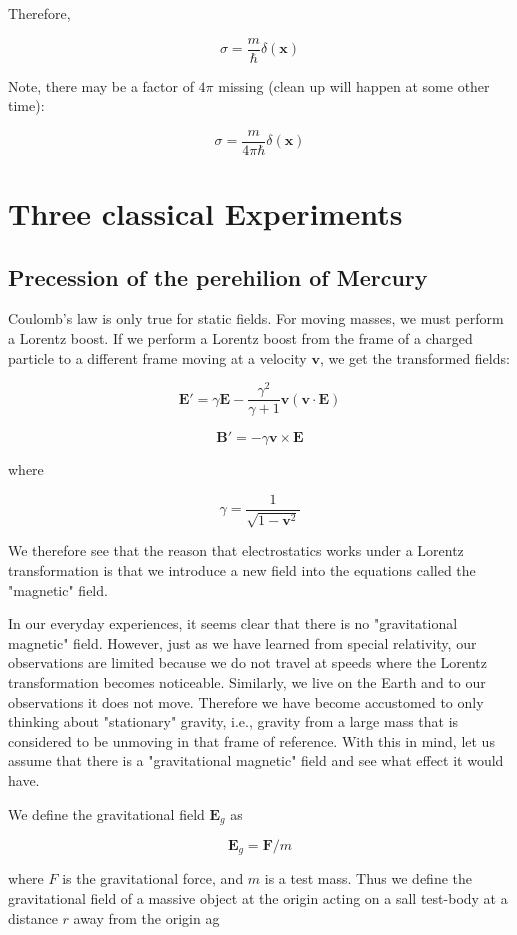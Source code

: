 \documentclass {article}
\renewcommand\vec{\mathbf}
\begin{document}
Therefore,

$$\sigma = \frac m \hbar \delta (\vec x) $$

Note, there may be a factor of $4 \pi $ missing (clean up will happen at some other time):

$$\sigma = \frac m {4 \pi \hbar} \delta (\vec x) $$


\newpage

\section{Three classical Experiments}
\subsection{Precession of the perehilion of Mercury}


Coulomb's law is only true for static fields. For moving masses, we must perform a Lorentz boost. If we perform a  Lorentz boost from the frame of a charged particle to a different frame moving at a velocity $\vec v$, we get the transformed fields:

$$\vec E' = \gamma \vec E - \frac {\gamma^2} {\gamma + 1} \vec v (\vec v \cdot \vec E) $$

$$ \vec B' = - \gamma \vec v \times \vec E$$

where 

$$ \gamma = \frac 1 {\sqrt{1 - \vec v^ 2} } $$ 

We therefore see that the reason that electrostatics works under a Lorentz transformation is that we introduce a new field into the equations called the "magnetic" field.

In our everyday experiences, it seems clear that there is no "gravitational magnetic" field. However, just as we have learned from special relativity, our observations are limited because we do not travel at speeds where the Lorentz transformation becomes noticeable. Similarly, we live on the Earth and to our observations it does not move. Therefore we have become accustomed to only thinking about "stationary" gravity, i.e., gravity from a large mass that is considered to be unmoving in that frame of reference. With this in mind, let us assume that there is a "gravitational magnetic" field and see what effect it would have.

We define the gravitational field $\vec E_g $ as

$$ \vec E_g = \vec F / m $$

where $F$ is the gravitational force, and $m$ is a test mass. Thus we define the gravitational field of a massive object at the origin acting on a sall test-body at a distance $r$ away from the origin ag
\end{document}
